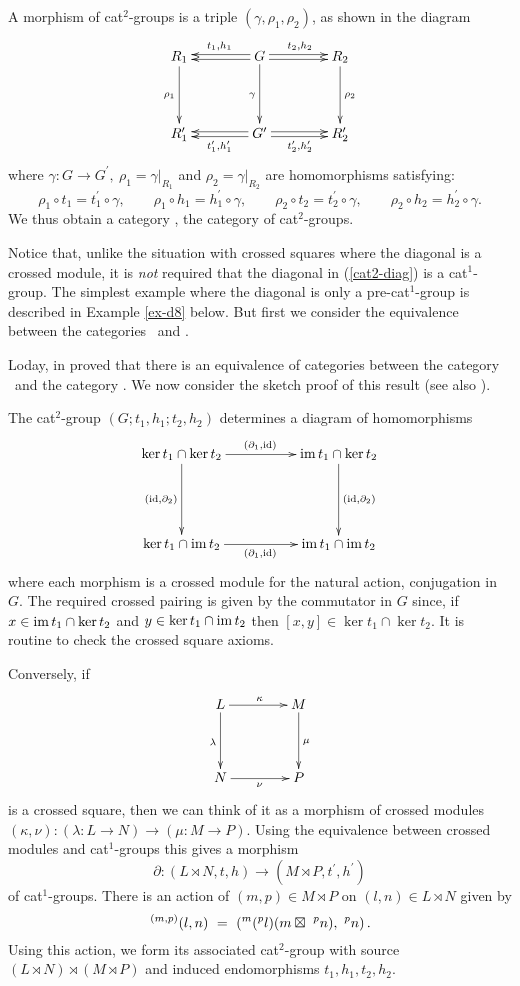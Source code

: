 \documentclass[a4paper,11pt]{article}
\theoremstyle{plain}
\theoremstyle{definition}
\begin{document}
\medskip
A morphism of cat$^{2}$-groups is a triple $(\gamma ,\rho_1 ,\rho_2)$,
as shown in the diagram 
\[
\xymatrix@R=40pt@C=40pt 
{ R_1 \ar[d]_{\rho_1} 
	& G \ar[d]_{\gamma} \ar@<-0.4ex>[l]_{t_1,h_1} \ar@<+0.4ex>[l]  
	                    \ar@<+0.4ex>[r]^{t_2,h_2} \ar@<-0.4ex>[r] 
		& R_2 \ar[d]^{\rho_2} \\
  R'_1 
	& G' \ar@<+0.4ex>[l]^{t'_1,h'_1} \ar@<-0.4ex>[l] 
	     \ar@<-0.4ex>[r]_{t'_2,h'_2} \ar@<+0.4ex>[r] 
		& R'_2 
}
\]
\noindent where 
$\gamma : G \to G^{\prime},~ \rho_1 = \gamma|_{R_1}$ 
and $\rho_2 = \gamma|_{R_2}$ are homomorphisms satisfying: 
\[ 
\rho_1 \circ t_1 = t_1^{\prime} \circ \gamma, \qquad 
\rho_1 \circ h_1 = h_1^{\prime} \circ \gamma, \qquad 
\rho_2 \circ t_2 = t_2^{\prime} \circ \gamma, \qquad 
\rho_2 \circ h_2 = h_2^{\prime} \circ \gamma. 
\] 
We thus obtain a category \catCatt, the category of cat$^{2}$-groups. 

Notice that, unlike the situation with crossed squares 
where the diagonal is a crossed module, 
it is \emph{not} required that the diagonal in (\ref{cat2-diag}) 
is a cat$^1$-group. 
The simplest example where the diagonal is only a pre-cat$^1$-group 
is described in Example \ref{ex-d8} below. 
But first we consider the equivalence between the categories 
\catXSq\ and \catCatt. 

Loday, in \cite{Loday} proved that there is an equivalence of categories 
between the category \catCatt\ and the category \catXSq.
We now consider the sketch proof of this result 
(see also \cite{mutlu-porter-2003}). 

The cat$^{2}$-group $(G;t_1,h_1;t_2,h_2)$ determines a diagram of homomorphisms 
\begin{equation} \label{ker-im-diag}
\xymatrix@R=50pt@C=50pt
{ \ker t_1 \cap \ker t_2 \ar[d]_{(\id,\partial_2)} \ar[r]^{(\partial_1,\id)} 
  	  & \im t_1 \cap \ker t_2 \ar[d]^{(\id,\partial_2)} \\ 
  \ker t_1 \cap \im t_2 \ar[r]_{(\partial_1,\id)}  
	  & \im t_1 \cap \im t_2 } 
\end{equation} 
\noindent where each morphism is a crossed module for the natural action, 
conjugation in $G$. 
The required crossed pairing is given by the commutator in $G$ since, 
if $x \in \mathrm{im}\, t_1 \cap \ker t_2$ and $y \in \ker t_1 \cap \mathrm{im}\, t_2$ 
then $[x,y] \in \ker t_1 \cap \ker t_2$. 
It is routine to check the crossed square axioms.
	
Conversely, if
\[
\xymatrix@R=40pt@C=40pt
{ L \ar[d]_{\lambda} \ar[r]^{\kappa}  
	  & M \ar[d]^{\mu} \\ 
  N \ar[r]_{\nu} 
	  & P }  
\]
\noindent is a crossed square, 
then we can think of it as a morphism of crossed modules 
$(\kappa,\nu) : (\lambda : L \to N) \rightarrow (\mu : M  \to P)$.
Using the equivalence between crossed modules and cat$^{1}$-groups this
gives a morphism
\[
\partial : (L \rtimes N,t,h) \longrightarrow (M \rtimes P, t^{\prime}, h^{\prime})
\]
of cat$^{1}$-groups. 
There is an action of $(m,p) \in M \rtimes P$ on $(l,n) \in L \rtimes N$ 
given by
\[
^{(m,p)}(l,n) ~=~ (^{m}(^{p}l) (m \boxtimes\ ^{p}n),\ ^{p}n)\,.
\] 
Using this action, we form its associated cat$^{2}$-group with source  
$(L \rtimes N) \rtimes (M \rtimes P)$ 
and induced endomorphisms $t_1,h_1,t_2,h_2$. 
\end{document}
